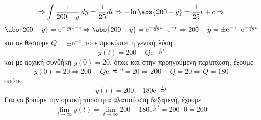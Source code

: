 \begin{solution}
\begin{enumerate}[i)]
\[        \Rightarrow \int \frac{1}{200-y} \,{dy} = \frac{1}{25} dt \Rightarrow 
        -\ln{\abs{200-y}} = \frac{1}{25} t + c \Rightarrow 
      \] 
      \[
        \abs{200-y} = \mathrm{e}^{-\frac{1}{25} t - c} 
        \Rightarrow \abs{200-y} = \mathrm{e}^{-\frac{1}{25} t} \cdot \mathrm{e}^{-c} 
        \Rightarrow 200-y = \pm \mathrm{e}^{-c} \cdot \mathrm{e}^{-\frac{1}{25} t}
      \] 
      και αν θέσουμε $ Q = \pm \mathrm{e}^{-c} $, τότε προκύπτει η γενική λύση 
      \[
        y(t) = 200 - Q \mathrm{e}^{-\frac{1}{25} t} 
      \] 
      και με αρχική συνθήκη $ y(0)=20 $, όπως και στην προηγούμενη περίπτωση, έχουμε 
      \[
        y(0)=20 \Rightarrow 200-Q \mathrm{e}^{-\frac{1}{25} \cdot 0} = 20 \Rightarrow 
        200 - Q = 20 \Rightarrow Q = 180
      \]
      οπότε
      \[
        y(t) = 200 - 180 \mathrm{e}^{-\frac{1}{25} t} 
      \]
      Για να βρούμε την οριακή ποσότητα αλατιού στη δεξαμενή, έχουμε
      \[
        \lim_{t \to \infty} y(t) = \lim_{t \to \infty} 200 -180 
        \mathrm{e}^{\frac{1}{25} t} = 200 \cdot 0 = 200 
      \]
  \end{enumerate}
\end{solution}




